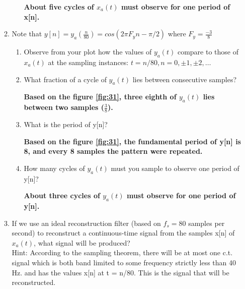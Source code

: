 \documentclass[12pt]{article}
\begin{document}
\begin{enumerate}
\begin{enumerate}
\begin{enumerate}
\textbf{About five cycles of $x_a(t)$ must observe for one period of x[n].}

\end{enumerate}








\item Note that $y[n] = y_a(\frac{n}{80}) = cos(2\pi F_y n-\pi/2)$ where $F_y = \frac{-3}{8}$
\begin{enumerate}

\item Observe from your plot how the values of $y_a(t)$ compare to those of $x_a(t)$ at the sampling instances: $t = n/80, n = 0, \pm 1, \pm 2, \hdots$
\item What fraction of a cycle of $y_a(t)$ lies between consecutive samples?

\textbf{Based on the figure \ref{fig:31}, three eighth of $y_a(t)$ lies between two samples ($\frac{3}{8}$).}

\item What is the period of y[n]?

\textbf{Based on the figure \ref{fig:31}, the fundamental period of y[n] is 8, and every 8 samples the pattern were repeated.}

\item How many cycles of $y_a(t)$ must you sample to observe one period of y[n]?

\textbf{About three cycles of $y_a(t)$ must observe for one period of y[n].}

\end{enumerate}













\item If we use an ideal reconstruction filter (based on $f_s=80$ samples per second) to reconstruct a continuous-time signal from the samples x[n] of $x_a(t)$, what signal will be produced? \\
Hint: According to the sampling theorem, there will be at most one c.t. signal which is both band limited to some frequency strictly less than 40 Hz. and has the values
x[n] at t = n/80. This is the signal that will be reconstructed.


\end{enumerate}
\end{enumerate}
\end{document}
